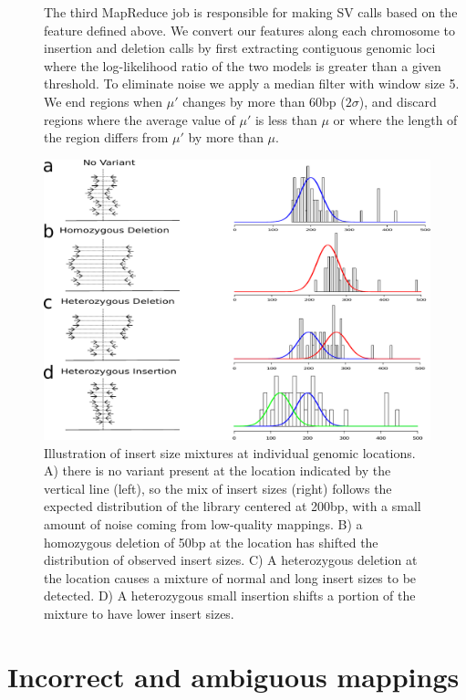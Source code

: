 \documentclass [11pt] {report}
\begin{document}
\begin{description}
\item[] The third MapReduce job is responsible for making SV calls based on the feature defined above. We convert our features along each chromosome to insertion and deletion calls by first extracting contiguous genomic loci where the log-likelihood ratio of the two models is greater than a given threshold. To eliminate noise we apply a median filter with window size 5. We end regions when $\mu'$ changes by more than 60bp ($2\sigma$), and discard regions where the average value of $\mu'$ is less than $\mu$ or where the length of the region differs from $\mu'$ by more than $\mu$.
\end{description}



\begin{figure}
\centering
\includegraphics[width=.9\textwidth]{figures/insert_size_mixtures.pdf}
\caption{Illustration of insert size mixtures at individual genomic locations. A) there is no variant present at the location indicated by the vertical line (left), so the mix of insert sizes (right) follows the expected distribution of the library centered at 200bp, with a small amount of noise coming from low-quality mappings. B) a homozygous deletion of 50bp at the location has shifted the distribution of observed insert sizes. C) A heterozygous deletion at the location causes a mixture of normal and long insert sizes to be detected. D) A heterozygous small insertion shifts a portion of the mixture to have lower insert sizes.}
\label{insert_size_mixes}
\end{figure}


\section{Incorrect and ambiguous mappings}
\end{document}
